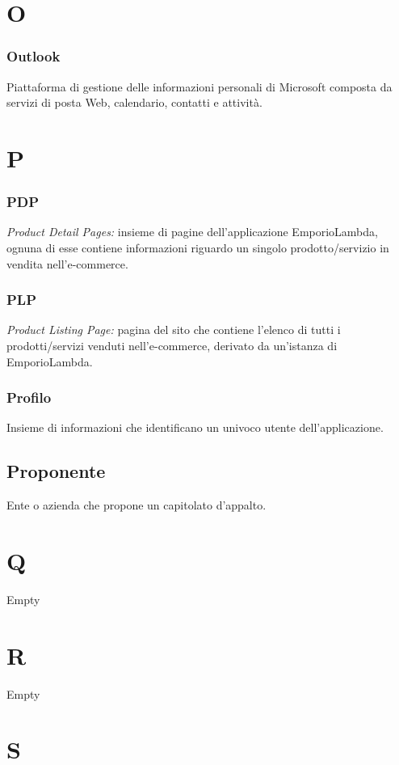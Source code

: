 \section*{O}
\subsubsection*{Outlook}
Piattaforma di gestione delle informazioni personali di Microsoft composta da servizi di posta Web, calendario, contatti e attività.

\section*{P}
\subsubsection*{PDP}
\textit{Product Detail Pages:} insieme di pagine dell'applicazione EmporioLambda, ognuna di esse contiene informazioni
riguardo un singolo prodotto/servizio in vendita nell'e-commerce.

\subsubsection*{PLP}
\textit{Product Listing Page:} pagina del sito che contiene l'elenco di tutti i prodotti/servizi venduti
nell'e-commerce, derivato da un'istanza di EmporioLambda.

\subsubsection*{Profilo}
Insieme di informazioni che identificano un univoco utente dell'applicazione.

\subsection*{Proponente}
Ente o azienda che propone un capitolato d'appalto.

\section*{Q}
Empty

\section*{R}
Empty

\section*{S}
